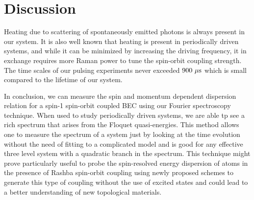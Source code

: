 \section{Discussion}


Heating due to scattering of spontaneously emitted photons is always present in our system. It is also well known that heating is present in periodically driven systems, and while it can be minimized by increasing the driving frequency, it in exchange requires more Raman power to tune the spin-orbit coupling strength. The time scales of our pulsing experiments never exceeded $900{\ \mu{\rm s}}$ which is small compared to the lifetime of our system.

In conclusion, we can measure the spin and momentum dependent dispersion relation for a spin-1 spin-orbit coupled BEC using our Fourier spectroscopy technique. When used to study periodically driven systems, we are able tp see a rich spectrum that arises from the Floquet quasi-energies. This method allows one to measure the spectrum of a system just by looking at the time evolution without the need of fitting to a complicated model and is good for any effective three level system with a quadratic branch in the spectrum. This technique might prove particularly useful to probe the spin-resolved energy dispersion of atoms in the presence of Rashba spin-orbit coupling using newly proposed schemes to generate this type of coupling without the use of excited states  \cite{_rashba_????} and could lead to a better understanding of new topological materials.
